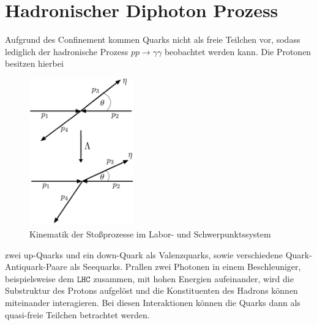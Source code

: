 \section{Hadronischer Diphoton Prozess}
Aufgrund des Confinement kommen Quarks nicht als freie Teilchen vor, sodass lediglich der hadronische Prozess $pp \rightarrow \gamma \gamma$ beobachtet werden kann.  Die Protonen besitzen hierbei
\begin{figure}
	\includegraphics[width=45mm]{graphics/Kinematik}
	\caption{Kinematik der Stoßprozesse im Labor- und Schwerpunktssystem}
\end{figure}
 zwei up-Quarks und ein down-Quark als Valenzquarks, sowie verschiedene Quark-Antiquark-Paare als Seequarks. Prallen zwei Photonen in einem Beschleuniger, beispielsweise dem $\texttt{LHC}$ zusammen, mit hohen Energien aufeinander, wird die Substruktur des Protons aufgelöst und die Konstituenten des Hadrons können miteinander interagieren. Bei diesen Interaktionen können die Quarks dann als quasi-freie Teilchen betrachtet werden.

